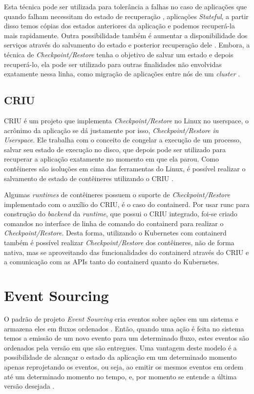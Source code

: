 Esta técnica pode ser utilizada para tolerância a falhas no caso de aplicações
que quando falham necessitam do estado de recuperação \cite{muller2022architecture}
\cite{Chen2015/10}, aplicações \textit{Stateful}, a partir disso temos cópias
dos estados anteriores da aplicação e podemos recuperá-la mais rapidamente.
Outra possibilidade também é aumentar a disponibilidade dos serviços através
do salvamento do estado e posterior recuperação dele \cite{vayghan2021kubernetes}.
Embora, a técnica de \textit{Checkpoint/Restore} tenha o objetivo de salvar um
estado e depois recuperá-lo, ela pode ser utilizado para outras finalidades não
envolvidas exatamente nessa linha, como migração de aplicações entre nós de um
\textit{cluster} \cite{Chen2015/10}.

\subsection{CRIU}

CRIU é um projeto que implementa \textit{Checkpoint/Restore} no Linux no
userspace, o acrônimo da aplicação se dá justamente por isso,
\textit{Checkpoint/Restore in Userspace}. Ele trabalha com o conceito de
congelar a execução de um processo, salvar seu estado de execução no disco,
que depois pode ser utilizado para recuperar a aplicação exatamente no
momento em que ela parou. Como contêineres são isoluções em cima das
ferramentas do Linux, é possível realizar o salvamento de estado de
contêineres utilizando o CRIU \cite{criu}.

Algumas \textit{runtimes} de contêineres possuem o suporte de
\textit{Checkpoint/Restore} implementado com o auxílio do CRIU, é o caso
do containerd. Por usar runc para construção do \textit{backend} da
\textit{runtime}, que possui o CRIU integrado, foi-se criado comandos no
interface de linha de comando do containerd para realizar o
\textit{Checkpoint/Restore}. Desta forma, utilizando o Kubernetes com
containerd também é possível realizar \textit{Checkpoint/Restore} dos
contêineres, não de forma nativa, mas se aproveitando das funcionalidades
do containerd através do CRIU e a comunicação com as APIs tanto do containerd
quanto do Kubernetes.

\section{Event Sourcing}

O padrão de projeto \textit{Event Sourcing} cria eventos sobre ações em um
sistema e armazena eles em fluxos ordenados \cite{event-sourcing}. Então,
quando uma ação é feita no sistema temos a emissão de um novo evento para
um determinado fluxo, estes eventos são ordenados pela versão em que são
entregues. Uma vantagem deste modelo é a possibilidade de alcançar o estado
da aplicação em um determinado momento apenas reprojetando os eventos, ou
seja, ao emitir os mesmos eventos em ordem até um determinado momento no
tempo, e, por momento se entende a última versão desejada
\cite{event-sourcing}.


